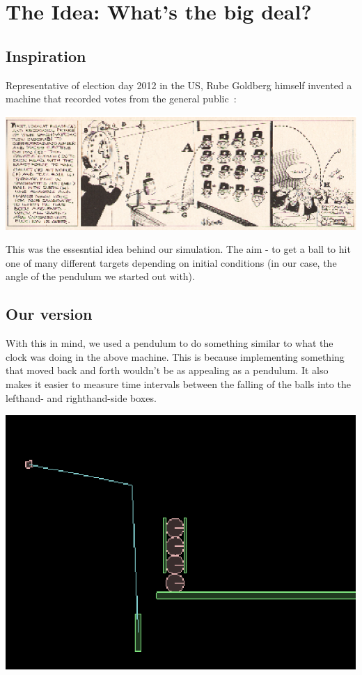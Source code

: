 \documentclass[a4paper,11pt]{article}
\begin{document}
\section{The Idea: What's the big deal?}

\subsection{Inspiration}
Representative of election day 2012 in the US, Rube Goldberg himself invented a machine that recorded votes from the general public~\cite{rube-election}:
\\
\begin{center}
\includegraphics[scale=1.5]{doc/elections.eps}
\end{center}
This was the essesntial idea behind our simulation. The aim - to get a ball to hit one of many different targets depending on initial conditions (in our case, the angle of the pendulum we started out with).

\subsection{Our version}
With this in mind, we used a pendulum to do something similar to what the clock was doing in the above machine. This is because implementing something that moved back and forth wouldn't be as appealing as a pendulum. It also makes it easier to measure time intervals between the falling of the balls into the lefthand- and righthand-side boxes.
\begin{center}
\includegraphics[scale=0.5]{doc/pendulum.eps}
\end{center}
\end{document}

